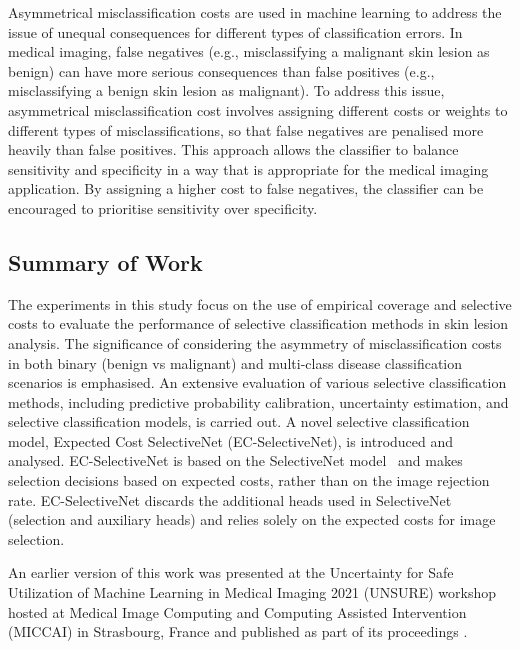 Asymmetrical misclassification costs are used in machine learning to address the issue of unequal consequences for different types of classification errors. In medical imaging, false negatives (e.g., misclassifying a malignant skin lesion as benign) can have more serious consequences than false positives (e.g., misclassifying a benign skin lesion as malignant). To address this issue, asymmetrical misclassification cost involves assigning different costs or weights to different types of misclassifications, so that false negatives are penalised more heavily than false positives. This approach allows the classifier to balance sensitivity and specificity in a way that is appropriate for the medical imaging application. By assigning a higher cost to false negatives, the classifier can be encouraged to prioritise sensitivity over specificity.

\subsection{Summary of Work}
\label{subsec:selective_summary_of_work}
The experiments in this study focus on the use of empirical coverage and selective costs to evaluate the performance of selective classification methods in skin lesion analysis. The significance of considering the asymmetry of misclassification costs in both binary (benign vs malignant) and multi-class disease classification scenarios is emphasised. An extensive evaluation of various selective classification methods, including predictive probability calibration, uncertainty estimation, and selective classification models, is carried out. A novel selective classification model, Expected Cost SelectiveNet (EC-SelectiveNet), is introduced and analysed. EC-SelectiveNet is based on the SelectiveNet model~\citep{selective2019geifman} and makes selection decisions based on expected costs, rather than on the image rejection rate. EC-SelectiveNet discards the additional heads used in SelectiveNet (selection and auxiliary heads) and relies solely on the expected costs for image selection.

An earlier version of this work was presented at the Uncertainty for Safe Utilization of Machine Learning in Medical Imaging 2021 (UNSURE) workshop hosted at Medical Image Computing and Computing Assisted Intervention (MICCAI) in Strasbourg, France and published as part of its proceedings \citep{carse2021robust}.



